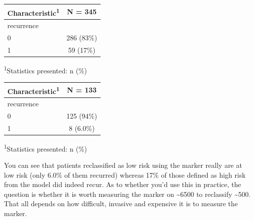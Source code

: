 \documentclass[]{book}
\newenvironment{Shaded}{\begin{snugshade}}{\end{snugshade}}
\newcommand{\DataTypeTok}[1]{\textcolor[rgb]{0.13,0.29,0.53}{#1}}
\newcommand{\DecValTok}[1]{\textcolor[rgb]{0.00,0.00,0.81}{#1}}
\newcommand{\KeywordTok}[1]{\textcolor[rgb]{0.13,0.29,0.53}{\textbf{#1}}}
\newcommand{\NormalTok}[1]{#1}
\newcommand{\OperatorTok}[1]{\textcolor[rgb]{0.81,0.36,0.00}{\textbf{#1}}}
\newcommand{\StringTok}[1]{\textcolor[rgb]{0.31,0.60,0.02}{#1}}
\begin{document}
\captionsetup[table]{labelformat=empty,skip=1pt}
\begin{longtable}{lc}
\toprule
\textbf{Characteristic}\textsuperscript{1} & \textbf{N = 345} \\ 
\midrule
recurrence &  \\ 
0 & 286 (83\%) \\ 
1 & 59 (17\%) \\ 
\bottomrule
\end{longtable}
\vspace{-5mm}
\begin{minipage}{\linewidth}
\textsuperscript{1}Statistics presented: n (\%) \\ 
\end{minipage}

\begin{Shaded}
\end{Shaded}

\captionsetup[table]{labelformat=empty,skip=1pt}
\begin{longtable}{lc}
\toprule
\textbf{Characteristic}\textsuperscript{1} & \textbf{N = 133} \\ 
\midrule
recurrence &  \\ 
0 & 125 (94\%) \\ 
1 & 8 (6.0\%) \\ 
\bottomrule
\end{longtable}
\vspace{-5mm}
\begin{minipage}{\linewidth}
\textsuperscript{1}Statistics presented: n (\%) \\ 
\end{minipage}

You can see that patients reclassified as low risk using the marker
really are at low risk (only 6.0\% of them recurred) whereas 17\% of
those defined as high risk from the model did indeed recur. As to
whether you'd use this in practice, the question is whether it is worth
measuring the marker on \textasciitilde6500 to reclassify
\textasciitilde500. That all depends on how difficult, invasive and
expensive it is to measure the marker.
\end{document}

